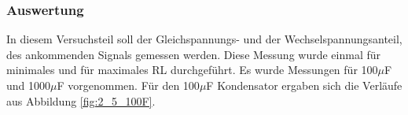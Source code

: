 \documentclass[12pt,a4paper]{article}
\begin{document}
\subsubsection{Auswertung}

In diesem Versuchsteil soll der Gleichspannungs- und der Wechselspannungsanteil, des ankommenden Signals gemessen werden. Diese Messung wurde einmal für minimales und für maximales RL durchgeführt. Es wurde Messungen für 100$\mu$F und 1000$\mu$F vorgenommen. Für den 100$\mu$F Kondensator ergaben sich die Verläufe aus Abbildung \ref{fig:2_5_100F}.
\end{document}

